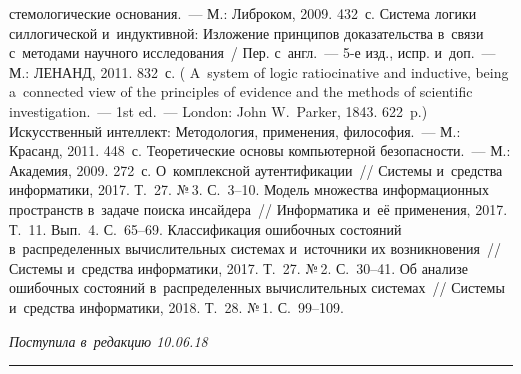 \begin{multicols}{2}
{{\begin{thebibliography}{9}
\noindent
стемологические основания.~--- М.: Либроком, 2009. 432~с.
 Система логики силлогической и~индуктивной: Изложение принципов 
доказательства в~связи с~методами научного исследования~/ Пер. с~англ.~--- 5-е изд., испр.  
и~доп.~--- М.: ЛЕНАНД, 2011. 832~с. ( A~system of logic ratiocinative and 
inductive, being a~connected view of the principles of evidence and the methods of scientific 
investigation.~--- 1st ed.~--- London: John W.~Parker, 1843. 622~p.)
 Искусственный интеллект: Методология, применения, философия.~--- М.: 
Красанд, 2011. 448~с.
 Теоретические основы компьютерной 
безопасности.~--- М.: Академия, 2009. 
272~с.
 О~комплексной 
аутентификации~// Сис\-те\-мы и~средства информатики, 2017. Т.~27. №\,3.\linebreak
 С.~3--10.
 Модель множества 
информационных пространств в~задаче поиска инсайдера~// Информатика и~её применения, 
2017. Т.~11. Вып.~4. С.~65--69.
 Классификация ошибочных состояний в~распределенных вычислительных 
системах и~источники их возникновения~// Системы и~средства информатики, 2017. Т.~27. №\,2. 
С.~30--41.
 Об анализе ошибочных состояний 
в~распределенных вычислительных системах~// Системы и~средства информатики, 2018. Т.~28. 
№\,1. С.~99--109.
 \end{thebibliography}

 }
 }

\end{multicols}

\vspace*{-6pt}

\hfill{\small\textit{Поступила в~редакцию 10.06.18}}

\vspace*{8pt}



\hrule

\vspace*{2pt}

